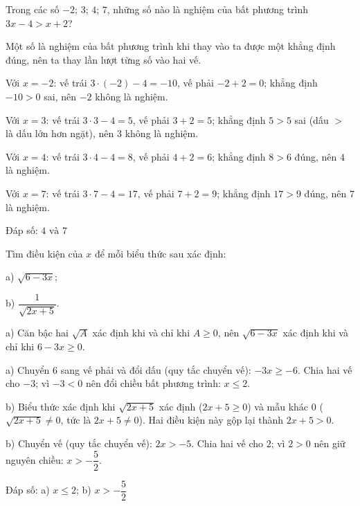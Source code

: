 \begin{problem}[9DS-BPT-011]
Trong các số $-2$; $3$; $4$; $7$, những số nào là nghiệm của bất phương trình $3x - 4 > x + 2$?

\begin{solution}
Một số là nghiệm của bất phương trình khi thay vào ta được một khẳng định đúng, nên ta thay lần lượt từng số vào hai vế.

Với $x = -2$: vế trái $3 \cdot (-2) - 4 = -10$, vế phải $-2 + 2 = 0$; khẳng định $-10 > 0$ sai, nên $-2$ không là nghiệm.

Với $x = 3$: vế trái $3 \cdot 3 - 4 = 5$, vế phải $3 + 2 = 5$; khẳng định $5 > 5$ sai (dấu $>$ là dấu lớn hơn ngặt), nên $3$ không là nghiệm.

Với $x = 4$: vế trái $3 \cdot 4 - 4 = 8$, vế phải $4 + 2 = 6$; khẳng định $8 > 6$ đúng, nên $4$ là nghiệm.

Với $x = 7$: vế trái $3 \cdot 7 - 4 = 17$, vế phải $7 + 2 = 9$; khẳng định $17 > 9$ đúng, nên $7$ là nghiệm.

Đáp số: $\boxed{4 \text{ và } 7}$
\end{solution}
\end{problem}

\begin{problem}[9DS-BPT-012]
Tìm điều kiện của $x$ để mỗi biểu thức sau xác định:

a) $\sqrt{6 - 3x}$;

b) $\dfrac{1}{\sqrt{2x + 5}}$.

\begin{solution}
a) Căn bậc hai $\sqrt{A}$ xác định khi và chỉ khi $A \geq 0$, nên $\sqrt{6 - 3x}$ xác định khi và chỉ khi $6 - 3x \geq 0$.

a) Chuyển $6$ sang vế phải và đổi dấu (quy tắc chuyển vế): $-3x \geq -6$. Chia hai vế cho $-3$; vì $-3 < 0$ nên đổi chiều bất phương trình: $x \leq 2$.

b) Biểu thức xác định khi $\sqrt{2x + 5}$ xác định ($2x + 5 \geq 0$) và mẫu khác $0$ ($\sqrt{2x + 5} \neq 0$, tức là $2x + 5 \neq 0$). Hai điều kiện này gộp lại thành $2x + 5 > 0$.

b) Chuyển vế (quy tắc chuyển vế): $2x > -5$. Chia hai vế cho $2$; vì $2 > 0$ nên giữ nguyên chiều: $x > -\dfrac{5}{2}$.

Đáp số: a) $\boxed{x \leq 2}$; b) $\boxed{x > -\dfrac{5}{2}}$
\end{solution}
\end{problem}

